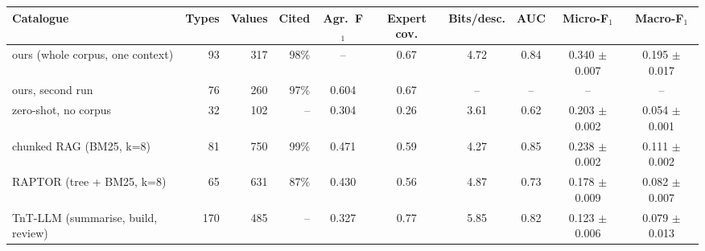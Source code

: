 \begin{tabular}{lrrrcccccc}
\toprule
Catalogue & Types & Values & Cited & Agr.\ F$_1$ & Expert cov. & Bits/desc. & AUC & Micro-F$_1$ & Macro-F$_1$ \\
\midrule
ours (whole corpus, one context) & 93 & 317 & 98\% & -- & 0.67 & 4.72 & 0.84 & 0.340 $\pm$ 0.007 & 0.195 $\pm$ 0.017 \\
ours, second run & 76 & 260 & 97\% & 0.604 & 0.67 & -- & -- & -- & -- \\
zero-shot, no corpus & 32 & 102 & -- & 0.304 & 0.26 & 3.61 & 0.62 & 0.203 $\pm$ 0.002 & 0.054 $\pm$ 0.001 \\
chunked RAG (BM25, k=8) & 81 & 750 & 99\% & 0.471 & 0.59 & 4.27 & 0.85 & 0.238 $\pm$ 0.002 & 0.111 $\pm$ 0.002 \\
RAPTOR (tree + BM25, k=8) & 65 & 631 & 87\% & 0.430 & 0.56 & 4.87 & 0.73 & 0.178 $\pm$ 0.009 & 0.082 $\pm$ 0.007 \\
TnT-LLM (summarise, build, review) & 170 & 485 & -- & 0.327 & 0.77 & 5.85 & 0.82 & 0.123 $\pm$ 0.006 & 0.079 $\pm$ 0.013 \\
\bottomrule
\end{tabular}
